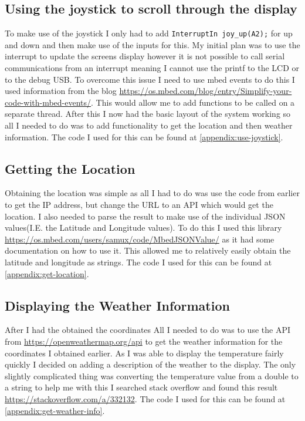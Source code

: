 \documentclass[a4paper,12pt]{scrartcl}
\begin{document}
{		\subsection{Using the joystick to scroll through the display}
		{
			To make use of the joystick I only had to add \lstinline|InterruptIn joy_up(A2);| for up and down and then make use of the inputs for this. My initial plan was to use the interrupt to update the screens display however it is not possible to call serial communications from an interrupt meaning I cannot use the printf to the LCD or to the debug USB. To overcome this issue I need to use mbed events to do this I used information from the blog \url{https://os.mbed.com/blog/entry/Simplify-your-code-with-mbed-events/}\cite{Jongboom2018}. This would allow me to add functions to be called on a separate thread. After this I now had the basic layout of the system working so all I needed to do was to add functionality to get the location and then weather information. The code I used for this can be found at \cref{appendix:use-joystick}.
		}
		\subsection{Getting the Location}
		{
			Obtaining the location was simple as all I had to do was use the code from earlier to get the IP address, but change the URL to an API which would get the location. I also needed to parse the result to make use of the individual JSON values(I.E. the Latitude and Longitude values). To do this I used this library \url{https://os.mbed.com/users/samux/code/MbedJSONValue/} as it had some documentation on how to use it. This allowed me to relatively easily obtain the latitude and longitude as strings. The code I used for this can be found at \cref{appendix:get-location}.
		}
		\subsection{Displaying the Weather Information}
		{
			After I had the obtained the coordinates All I needed to do was to use the API from \url{https://openweathermap.org/api} to get the weather information for the coordinates I obtained earlier. As I was able to display the temperature fairly quickly I decided on adding a description of the weather to the display. The  only slightly complicated thing was converting the temperature value from a double to a string to help me with this I searched stack overflow and found this result \url{https://stackoverflow.com/a/332132}\cite{Schaub2008}. The code I used for this can be found at \cref{appendix:get-weather-info}.
		}
	}
	
\end{document}
